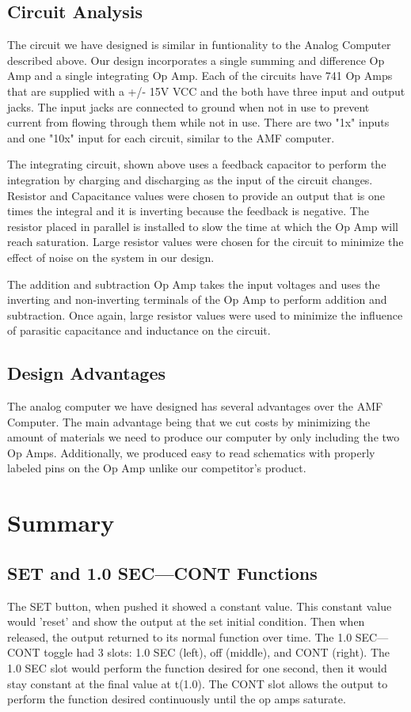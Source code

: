 \documentclass[11pt]{article}
\begin{document}
\subsection*{Circuit Analysis}
	The circuit we have designed is similar in funtionality to the Analog Computer described above. Our design incorporates a single summing and difference Op Amp and a single integrating Op Amp. Each of the circuits have 741 Op Amps that are supplied with a +/- 15V VCC and the both have three input and output jacks.  The input jacks are connected to ground when not in use to prevent current from flowing through them while not in use. There are two "1x" inputs and one "10x" input for each circuit, similar to the AMF computer.
	
	The integrating circuit, shown above uses a feedback capacitor to perform the integration by charging and discharging as the input of the circuit changes. Resistor and Capacitance values were chosen to provide an output that is one times the integral and it is inverting because the feedback is negative. The resistor placed in parallel is installed to slow the time at which the Op Amp will reach saturation. Large resistor values were chosen for the circuit to minimize the effect of noise on the system in our design.
	
	The addition and subtraction Op Amp takes the input voltages and uses the inverting and non-inverting terminals of the Op Amp to perform addition and subtraction. Once again, large resistor values were used to minimize the influence of parasitic capacitance and inductance on the circuit. 
\subsection*{Design Advantages}	
	The analog computer we have designed has several advantages over the AMF Computer. The main advantage being that we cut costs by minimizing the amount of materials we need to produce our computer by only including the two Op Amps. Additionally, we produced easy to read schematics with properly labeled pins on the Op Amp unlike our competitor's product.
 \section*{Summary}
\subsection*{SET and 1.0 SEC---CONT Functions}
	The SET button, when pushed it showed a constant value. This constant value would 'reset' and show the output at the set initial condition. Then when released, the output returned to its normal function over time. 
	The 1.0 SEC---CONT toggle had 3 slots: 1.0 SEC (left), off (middle), and CONT (right). The 1.0 SEC slot would perform the function desired for one second, then it would stay constant at the final value at t(1.0).
	The CONT slot allows the output to perform the function desired continuously until the op amps saturate.  
	
\end{document}
